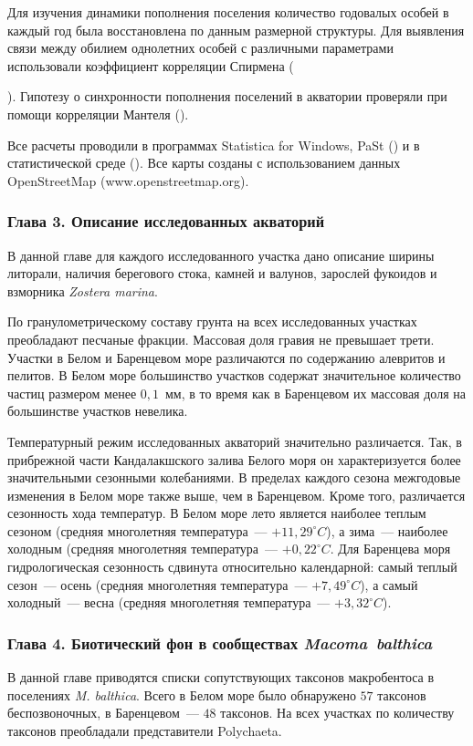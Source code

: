 Для изучения динамики пополнения поселения количество годовалых особей в каждый год была восстановлена по данным размерной структуры.
Для выявления связи между обилием однолетних особей с различными параметрами использовали коэффициент корреляции Спирмена ({\cite{Hollander_et_al_2013}).
Гипотезу о синхронности пополнения поселений в акватории проверяли при помощи корреляции Мантеля (\cite{Legendre_Legendre_2012}).

Все расчеты проводили в программах Statistica for Windows,  PaSt (\cite{Hammer_et_al_2001}) и в статистической среде \R{} (\cite{R_2014}). 
Все карты созданы с использованием данных OpenStreetMap (www.openstreetmap.org).

\subsubsection*{Глава 3. Описание исследованных акваторий}
В данной главе для каждого исследованного участка дано описание ширины литорали, наличия берегового стока, камней и валунов, зарослей фукоидов и взморника \textit{Zostera marina}.

По гранулометрическому составу грунта на всех исследованных участках преобладают песчаные фракции.
Массовая доля гравия не превышает трети.
Участки в Белом и Баренцевом море различаются по содержанию алевритов и пелитов. 
В Белом море большинство участков содержат значительное количество частиц размером менее $0,1$~мм, в то время как в Баренцевом их массовая доля на большинстве участков невелика.

Температурный режим исследованных акваторий значительно различается.
Так, в прибрежной части Кандалакшского залива Белого моря он характеризуется более значительными сезонными колебаниями.
В пределах каждого сезона межгодовые изменения в Белом море также выше, чем в Баренцевом.
Кроме того, различается сезонность хода температур. 
В Белом море лето является наиболее теплым сезоном (средняя многолетняя температура~--- $+11,29^{\circ}C$), а зима~--- наиболее холодным (средняя многолетняя температура~--- $+0,22^{\circ}C$.
Для Баренцева моря гидрологическая сезонность сдвинута относительно календарной: самый теплый сезон~--- осень (средняя многолетняя температура~--- $+7,49^{\circ}C$), а самый холодный~--- весна (средняя многолетняя температура~--- $+3,32^{\circ}C$).



\subsubsection*{Глава 4. Биотический фон в сообществах \textit{Macoma~balthica}}
В данной главе приводятся списки сопутствующих таксонов макробентоса в поселениях {\it M. balthica}.
Всего в Белом море было обнаружено $57$ таксонов беспозвоночных, в Баренцевом~--- $48$ таксонов.
На всех участках по количеству таксонов преобладали представители Polychaeta.

}
